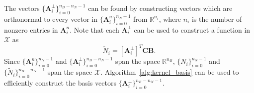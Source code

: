 The vectors $\{\mathbf{A}^\perp_i\}_{i=0}^{n_B-n_N-1}$ can be found by constructing vectors which are orthonormal to every vector in $\{\mathbf{A}^n_i\}_{i=0}^{n_N-1}$ from $\mathbb{R}^{n_i}$, where $n_i$ is the number of nonzero entries in $\mathbf{A}^n_i$. Note that each $\mathbf{A}^\perp_i$ can be used to construct a function in $\mathcal{X}$ as
\begin{equation}
	\tilde{N}_i=\left[\mathbf{A}^\perp_i\right]^T \mathbf{CB}.\label{eq:tidle-spline-basis}
\end{equation}
Since $\{\mathbf{A}^n_i\}_{i=0}^{n_N-1}$ and $\{\mathbf{A}^\perp_i\}_{i=0}^{n_B-n_N-1}$ span the space $\mathbb{R}^{n_B}$, $\{N_i\}_{i=0}^{n_N-1}$ and $\{\tilde{N}_i\}_{i=0}^{n_B-n_N-1}$ span the space $\mathcal{X}$. Algorithm~\ref{alg:kernel_basis} can be used to efficiently construct the basis vectors $\{\mathbf{A}^\perp_i\}_{i=0}^{n_B-n_N-1}$.\par

